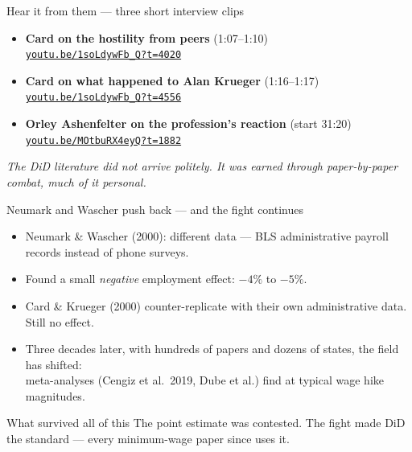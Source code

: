 \documentclass[aspectratio=169,11pt]{beamer}
\begin{document}
\begin{frame}{Hear it from them --- three short interview clips}
\vspace{0.5em}
\begin{itemize}
  \item \textbf{Card on the hostility from peers} (1:07--1:10) \\
        \href{https://youtu.be/1soLdywFb_Q?si=laAVYf_E2KBZKywG&t=4020}{\color{ocean}\texttt{youtu.be/1soLdywFb\_Q?t=4020}}
  \vspace{0.3em}
  \item \textbf{Card on what happened to Alan Krueger} (1:16--1:17) \\
        \href{https://youtu.be/1soLdywFb_Q?si=jsb8h50ZosGDnKrv&t=4556}{\color{ocean}\texttt{youtu.be/1soLdywFb\_Q?t=4556}}
  \vspace{0.3em}
  \item \textbf{Orley Ashenfelter on the profession's reaction} (start 31:20) \\
        \href{https://youtu.be/MOtbuRX4eyQ?t=1882}{\color{ocean}\texttt{youtu.be/MOtbuRX4eyQ?t=1882}}
\end{itemize}
\vspace{0.6em}
\begin{center}
\small\color{warmgray}\itshape
The DiD literature did not arrive politely. \;It was earned through paper-by-paper combat, much of it personal.
\end{center}
\end{frame}

\begin{frame}{Neumark and Wascher push back --- and the fight continues}
\vspace{0.4em}
\begin{itemize}
  \item Neumark \& Wascher (2000): different data --- BLS administrative payroll records instead of phone surveys.
  \item Found a small \textit{negative} employment effect: $-4\%$ to $-5\%$.
  \item Card \& Krueger (2000) counter-replicate with their own administrative data. \;Still no effect.
  \item Three decades later, with hundreds of papers and dozens of states, the field has shifted: \\
        meta-analyses (Cengiz et al.\ 2019, Dube et al.) find  at typical wage hike magnitudes.
\end{itemize}
\vspace{0.5em}
\begin{block}{What survived all of this}
\small
The point estimate was contested. \; \;The fight made DiD the standard --- every minimum-wage paper since uses it.
\end{block}
\end{frame}
\end{document}

